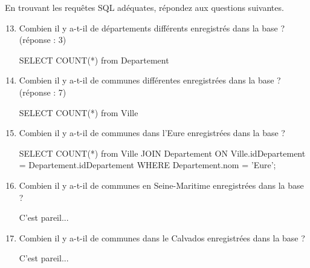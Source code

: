 \documentclass[a4paper,12pt,french]{book}
\begin{document}
En trouvant les requêtes SQL adéquates, répondez aux questions suivantes.

\begin{enumerate}
	\setcounter{enumi}{12}
\item  Combien il y a-t-il de départements différents enregistrés dans la base ? (réponse : 3)
\begin{sql}
SELECT COUNT(*) from Departement
\end{sql}
\item Combien il y a-t-il de communes différentes enregistrées dans la base ? (réponse : 7)
\begin{sql}
SELECT COUNT(*) from Ville
\end{sql}
\item Combien il y a-t-il de communes dans l’Eure enregistrées dans la base ?
\begin{sql}
SELECT COUNT(*) from Ville
    JOIN Departement ON Ville.idDepartement = Departement.idDepartement
    WHERE Departement.nom = 'Eure';
\end{sql}

\item  Combien il y a-t-il de communes en Seine-Maritime enregistrées dans la base ? 
\begin{corrige}
C'est pareil...
\end{corrige}
\item Combien il y a-t-il de communes dans le Calvados enregistrées dans la base ? 
\begin{corrige}
C'est pareil...
\end{corrige}
\end{enumerate}
\end{document}
